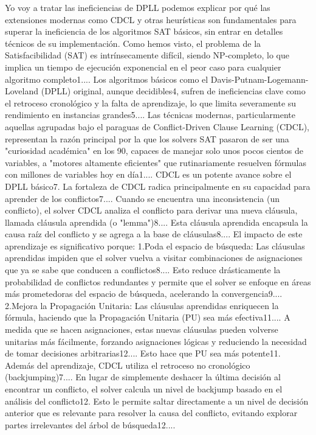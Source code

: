 Yo voy a tratar las ineficiencias de DPLL
podemos explicar por qué las extensiones modernas como CDCL y otras heurísticas son fundamentales para superar la ineficiencia de los algoritmos SAT básicos, sin entrar en detalles técnicos de su implementación.
Como hemos visto, el problema de la Satisfacibilidad (SAT) es intrínsecamente difícil, siendo NP-completo, lo que implica un tiempo de ejecución exponencial en el peor caso para cualquier algoritmo completo1.... Los algoritmos básicos como el Davis-Putnam-Logemann-Loveland (DPLL) original, aunque decidibles4, sufren de ineficiencias clave como el retroceso cronológico y la falta de aprendizaje, lo que limita severamente su rendimiento en instancias grandes5....
Las técnicas modernas, particularmente aquellas agrupadas bajo el paraguas de Conflict-Driven Clause Learning (CDCL), representan la razón principal por la que los solvers SAT pasaron de ser una "curiosidad académica" en los 90, capaces de manejar solo unos pocos cientos de variables, a "motores altamente eficientes" que rutinariamente resuelven fórmulas con millones de variables hoy en día1.... CDCL es un potente avance sobre el DPLL básico7.
La fortaleza de CDCL radica principalmente en su capacidad para aprender de los conflictos7.... Cuando se encuentra una inconsistencia (un conflicto), el solver CDCL analiza el conflicto para derivar una nueva cláusula, llamada cláusula aprendida (o "lemma")8.... Esta cláusula aprendida encapsula la causa raíz del conflicto y se agrega a la base de cláusulas8....
El impacto de este aprendizaje es significativo porque:
1.Poda el espacio de búsqueda: Las cláusulas aprendidas impiden que el solver vuelva a visitar combinaciones de asignaciones que ya se sabe que conducen a conflictos8.... Esto reduce drásticamente la probabilidad de conflictos redundantes y permite que el solver se enfoque en áreas más prometedoras del espacio de búsqueda, acelerando la convergencia9....
2.Mejora la Propagación Unitaria: Las cláusulas aprendidas enriquecen la fórmula, haciendo que la Propagación Unitaria (PU) sea más efectiva11.... A medida que se hacen asignaciones, estas nuevas cláusulas pueden volverse unitarias más fácilmente, forzando asignaciones lógicas y reduciendo la necesidad de tomar decisiones arbitrarias12.... Esto hace que PU sea más potente11.
Además del aprendizaje, CDCL utiliza el retroceso no cronológico (backjumping)7.... En lugar de simplemente deshacer la última decisión al encontrar un conflicto, el solver calcula un nivel de backjump basado en el análisis del conflicto12. Esto le permite saltar directamente a un nivel de decisión anterior que es relevante para resolver la causa del conflicto, evitando explorar partes irrelevantes del árbol de búsqueda12....
